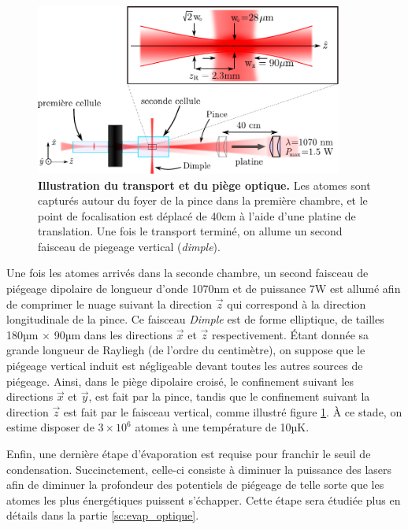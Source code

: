 \begin{figure}
\centering
\includegraphics[width=0.9\textwidth]{Fig/BEC_manip/piege_optique.pdf}
\caption{\textbf{Illustration du transport et du piège optique.} Les atomes sont capturés autour du foyer de la pince dans la première chambre, et le point de focalisation est déplacé de 40cm à l'aide d'une platine de translation. Une fois le transport terminé, on allume un second faisceau de piegeage vertical (\emph{dimple}).}
\label{fig:piege_optique}
\end{figure}

Une fois les atomes arrivés dans la seconde chambre, un second faisceau de piégeage dipolaire de longueur d'onde 1070nm et de puissance 7W est allumé afin de comprimer le nuage suivant la direction $\vec{z}$ qui correspond à la direction longitudinale de la pince. Ce faisceau \emph{Dimple} est de forme elliptique, de tailles 180µm $\times$ 90µm dans les directions $\vec{x}$ et $\vec{z}$ respectivement. Étant donnée sa grande longueur de Rayliegh (de l'ordre du centimètre), on suppose que le piégeage vertical induit est négligeable devant toutes les autres sources de piégeage. Ainsi, dans le piège dipolaire croisé, le confinement suivant les directions $\vec{x}$ et $\vec{y}$, est fait par la pince, tandis que le confinement suivant la direction $\vec{z}$ est fait par le faisceau vertical, comme illustré figure \ref{fig:piege_optique}. À ce stade, on estime disposer de $3 \times 10^6$ atomes à une température de 10µK.

Enfin, une dernière étape d'évaporation est requise pour franchir le seuil de condensation. Succinctement, celle-ci consiste à diminuer la puissance des lasers afin de diminuer la profondeur des potentiels de piégeage de telle sorte que les atomes les plus énergétiques puissent s'échapper. Cette étape sera étudiée plus en détails dans la partie \ref{sc:evap_optique}.



